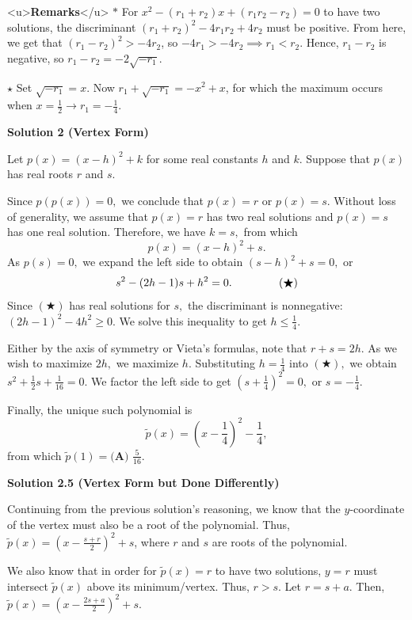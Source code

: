 \begin{enumerate}
 <u>\textbf{Remarks}</u>
$*$ For $x^2-(r_1+r_2)x+(r_1r_2-r_2)=0$ to have two solutions, the discriminant $(r_1+r_2)^2-4r_1r_2+4r_2$ must be positive. From here, we get that $(r_1-r_2)^2>-4r_2$, so $-4r_1>-4r_2 \implies r_1<r_2$. Hence, $r_1-r_2$ is negative, so $r_1-r_2=-2\sqrt{-r_1}$.

 $\star$ Set $\sqrt{-r_1}=x$. Now $r_1+\sqrt{-r_1}=-x^2+x$, for which the maximum occurs when $x=\frac{1}{2} \rightarrow r_1=-\frac{1}{4}$.

 



\textbf{Solution 2 (Vertex Form)}

Let $p(x)=(x-h)^2+k$ for some real constants $h$ and $k.$ Suppose that $p(x)$ has real roots $r$ and $s.$

 Since $p(p(x))=0,$ we conclude that $p(x)=r$ or $p(x)=s.$ Without loss of generality, we assume that $p(x)=r$ has two real solutions and $p(x)=s$ has one real solution. Therefore, we have $k=s,$ from which 
 \[p(x)=(x-h)^2+s.\]As $p(s)=0,$ we expand the left side to obtain $(s-h)^2+s=0,$ or 
 \[s^2-(2h-1)s+h^2=0. \hspace{15mm}(\bigstar)\]Since $(\bigstar)$ has real solutions for $s,$ the discriminant is nonnegative: $(2h-1)^2-4h^2\geq0.$ We solve this inequality to get $h\leq \frac14.$

 Either by the axis of symmetry or Vieta's formulas, note that $r+s=2h.$ As we wish to maximize $2h,$ we maximize $h.$ Substituting $h=\frac14$ into $(\bigstar),$ we obtain $s^2+\frac12s+\frac{1}{16}=0.$ We factor the left side to get $\left(s+\frac14\right)^2=0,$ or $s=-\frac14.$

 Finally, the unique such polynomial is 
 \[\tilde{p}(x)=\left(x-\frac14\right)^2-\frac14,\] from which $\tilde{p}(1)=\boxed{\textbf{(A) } \frac{5}{16}}.$




\textbf{Solution 2.5 (Vertex Form but Done Differently)}

Continuing from the previous solution's reasoning, we know that the $y$-coordinate of the vertex must also be a root of the polynomial. Thus, $\tilde{p}(x) = \left(x - \frac{s + r}{2}\right)^2 + s$, where $r$ and $s$ are roots of the polynomial.

 We also know that in order for $\tilde{p}(x) = r$ to have two solutions, $y = r$ must intersect $\tilde{p}(x)$ above its minimum/vertex. Thus, $r > s$. Let $r = s + a$. Then, $\tilde{p}(x) = \left(x - \frac {2s + a}{2}\right)^2 + s$. 


\end{enumerate}
